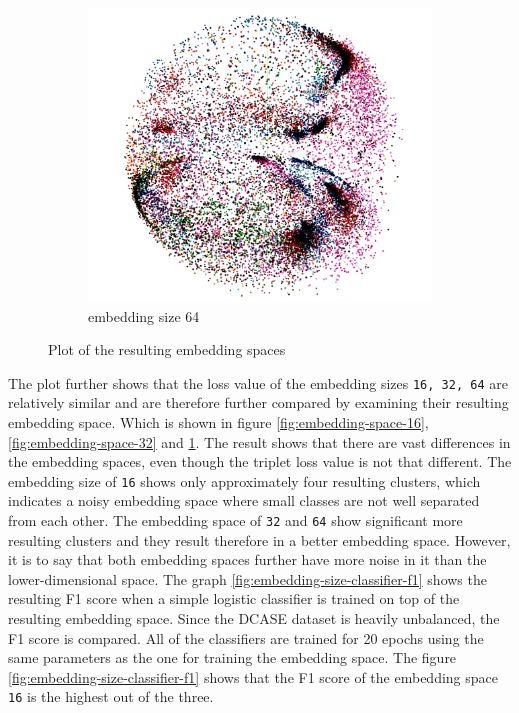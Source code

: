 \begin{figure}[t]
\begin{subfigure}{.33\linewidth}
  \includegraphics[width=.9\linewidth]{study-doc/experiment_embedding_size/assets/embedding_space_64.png}
  \caption{embedding size 64}
  \label{fig:embedding-space-64}
\end{subfigure}
\caption{Plot of the resulting embedding spaces}
\label{fig:embedding-size-experiment-embedding-space}
\end{figure}
\newline
\newline
\noindent
The plot further shows that the loss value of the embedding sizes \texttt{16, 32, 64} are relatively similar and are therefore further compared by examining their resulting embedding space. Which is shown in figure \ref{fig:embedding-space-16}, \ref{fig:embedding-space-32} and \ref{fig:embedding-space-64}. The result shows that there are vast differences in the embedding spaces, even though the triplet loss value is not that different. The embedding size of \texttt{16} shows only approximately four resulting clusters, which indicates a noisy embedding space where small classes are not well separated from each other. The embedding space of \texttt{32} and \texttt{64} show significant more resulting clusters and they result therefore in a better embedding space. However, it is to say that both embedding spaces further have more noise in it than the lower-dimensional space.
\newline
\newline
The graph \ref{fig:embedding-size-classifier-f1} shows the resulting F1 score when a simple logistic classifier is trained on top of the resulting embedding space. Since the \gls{DCASE} dataset is heavily unbalanced, the F1 score is compared. All of the classifiers are trained for 20 epochs using the same parameters as the one for training the embedding space. The figure \ref{fig:embedding-size-classifier-f1} shows that the F1 score of the embedding space \texttt{16} is the highest out of the three.
